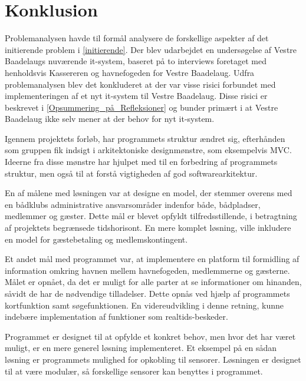 \chapter{Konklusion}
\label{cha:konklusion}

Problemanalysen havde til formål analysere de forskellige aspekter af det initierende problem i \cref{initierende}. Der blev udarbejdet en undersøgelse af Vestre Baadelaugs nuværende it-system, baseret på to interviews foretaget med henholdsvis Kassereren og havnefogeden for Vestre Baadelaug. Udfra problemanalysen blev det konkluderet at der var visse risici forbundet med implementeringen af et nyt it-system til Vestre Baadelaug. Disse risici er beskrevet i \cref{Opsummering_på_Refleksioner} og bunder primært i at Vestre Baadelaug ikke selv mener at der behov for nyt it-system. 



Igennem projektets forløb, har programmets struktur ændret sig, efterhånden som gruppen fik indsigt i arkitektoniske designmønstre, som eksempelvis MVC. Ideerne fra disse mønstre har hjulpet med til en forbedring af programmets struktur, men også til at forstå vigtigheden af god softwarearkitektur.

En af målene med løsningen var at designe en model, der stemmer overens med en bådklubs administrative ansvarsområder indenfor både, bådpladser, medlemmer og gæster. Dette mål er blevet opfyldt tilfredsstillende, i betragtning af projektets begrænsede tidshorisont. En mere komplet løsning, ville inkludere en model for gæstebetaling og medlemskontingent.

Et andet mål med programmet var, at implementere en platform til formidling af information omkring havnen mellem havnefogeden, medlemmerne og gæsterne. Målet er opnået, da det er muligt for alle parter at se informationer om hinanden, såvidt de har de nødvendige tilladelser. Dette opnås ved hjælp af programmets kortfunktion samt søgefunktionen. En videreudvikling i denne retning, kunne indebære implementation af funktioner som realtids-beskeder.

Programmet er designet til at opfylde et konkret behov, men hvor det har været muligt, er en mere generel løsning implementeret. Et eksempel på en sådan løsning er programmets mulighed for opkobling til sensorer. Løsningen er designet til at være modulær, så forskellige sensorer kan benyttes i programmet.

